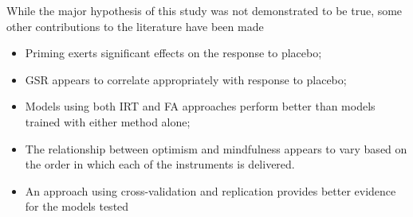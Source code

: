 While the major hypothesis of this study was not demonstrated to be
true, some other contributions to the literature have been made
\begin{itemize}
\item Priming exerts significant effects on the response to placebo;
\item GSR appears to correlate appropriately with response to placebo;
\item Models using both IRT and FA approaches perform better than
models trained with either method alone;
\item The relationship between optimism and mindfulness appears to
vary based on the order in which each of the instruments is delivered.
\item An approach using cross-validation and replication provides better evidence for the models tested
\end{itemize}

